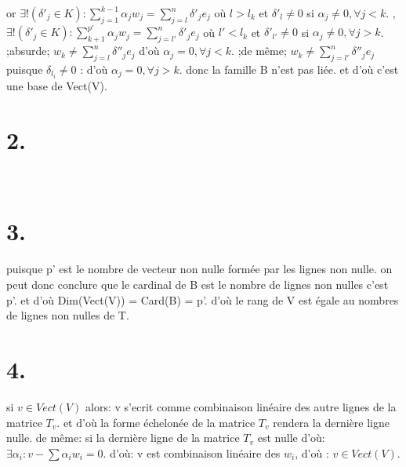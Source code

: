 \documentclass{article}
\begin{document}
or $\exists!(\delta'_j\in{K}) : \sum_{j=1}^{k-1} \alpha_j w_j = \sum_{j=l}^{n}\delta'_je_j$ où $l>l_k$ et $\delta'_{l} \neq 0$ si $\alpha_j \neq 0,\forall j<k$.\newline
,$\exists!(\delta'_j\in{K}) : \sum_{k+1}^{p'} \alpha_j w_j = \sum_{j=l'}^{n}\delta'_je_j$ où $l'<l_k$ et $\delta'_{l'} \neq 0$ si $\alpha_j \neq 0,\forall j>k$.\newline
;absurde; $w_k \neq \sum_{j=l}^{n}\delta''_je_j$ d'où $\alpha_j = 0,\forall j<k$.\newline
;de même; $w_k \neq \sum_{j=l'}^{n}\delta''_je_j$  puisque $\delta_{l_i}\neq 0$ :  d'où $\alpha_j = 0,\forall j>k$.\newline
\newline donc la famille B n'est pas liée. et d'où c'est une base de Vect(V).
\
\vspace{20pt}
\section*{2.}\
\section*{3.}
puisque p' est le nombre de vecteur non nulle formée par les lignes non nulle.\newline
on peut donc conclure que le cardinal de B est le nombre de lignes non nulles c'est p'.\newline
et d'où Dim(Vect(V)) = Card(B) = p'. d'où le rang de V est égale au nombres de lignes non nulles de T.
\
\section*{4.}
si $v \in Vect(V)$ alors: v s'ecrit comme combinaison linéaire des autre lignes de la matrice $T_v$.\newline
et d'où la forme échelonée de la matrice $T_v$ rendera la dernière ligne nulle.\newline
de même: si la dernière ligne de la matrice $T_v$ est nulle d'où: $\exists\alpha_i : v - \sum\alpha_iw_i = 0$.\newline
d'où: v est combinaison linéaire des $w_i$, d'où : $v \in Vect(V)$.
\
\end{document}
